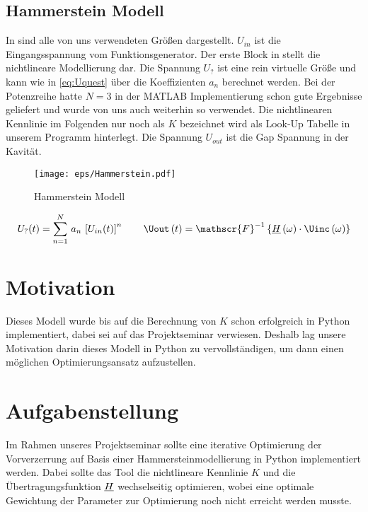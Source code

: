\documentclass[../Report.tex]{subfiles}
\begin{document}
\subsection{Hammerstein Modell}
\label{subsec:einf.modell_BB.hammerstein}
In  sind alle von uns verwendeten Größen dargestellt. $U_{in}$ ist die Eingangsspannung vom Funktionsgenerator. Der erste Block in  stellt die nichtlineare Modellierung dar. Die Spannung $U_{?}$ ist eine rein virtuelle Größe und kann wie in \eqref{eq:Uquest} über die Koeffizienten $a_n$ berechnet werden. Bei der Potenzreihe hatte $N = 3$ in der MATLAB Implementierung schon gute Ergebnisse geliefert und wurde von uns auch weiterhin so verwendet. Die nichtlinearen Kennlinie im Folgenden nur noch als $K$ bezeichnet wird als Look-Up Tabelle in unserem Programm hinterlegt. Die Spannung $U_{out}$ ist die Gap Spannung in der Kavität.
\begin{figure}[H]
	\centering
	\texttt{[image: eps/Hammerstein.pdf]}
	\caption{Hammerstein Modell}
  	\label{fig:Hammerstein}
\end{figure}
\begin{align}
	U_?(t)=\sum_{n=1}^N \, a_n \, \left[ U_{in}(t) \right]^n
	\label{eq:Uquest}
	\qquad
	\Uout \oft = \mathscr{F}^{-1} \left\{ \Hcompl \ofomega \cdot \Uinc \ofomega \right\}
\end{align}


\section{Motivation}
\label{sec:einf.motivation}
Dieses Modell wurde bis auf die Berechnung von $K$ schon erfolgreich in Python implementiert, dabei sei auf das Projektseminar \cite{PJS_Denys} verwiesen. Deshalb lag unsere Motivation darin dieses Modell in Python zu vervollständigen, um dann einen möglichen Optimierungsansatz aufzustellen.


\section{Aufgabenstellung}
\label{sec:einf.aufgabe}
Im Rahmen unseres Projektseminar sollte eine iterative Optimierung der Vorverzerrung auf Basis einer Hammersteinmodellierung in Python implementiert werden. Dabei sollte das Tool die nichtlineare Kennlinie $K$ und die Übertragungsfunktion $\underline{H}$ wechselseitig optimieren, wobei eine optimale Gewichtung der Parameter zur Optimierung noch nicht erreicht werden musste.
\end{document}
